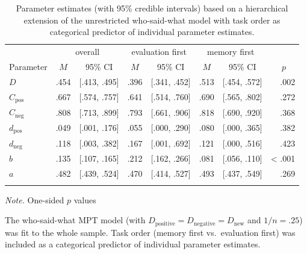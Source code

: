 \documentclass[
  man,floatsintext]{apa6}
\begin{document}
\begin{table}[tbp]

\begin{center}
\begin{threeparttable}

\caption{\label{tab:exp1-param}Parameter estimates (with 95\% credible intervals) based on a hierarchical extension of the unrestricted who-said-what model with task order as categorical predictor of individual parameter estimates.}

\begin{tabular}{lccccccr}
\toprule
 & \multicolumn{2}{c}{overall} & \multicolumn{2}{c}{evaluation first} & \multicolumn{2}{c}{memory first}  &\\
\cmidrule(r){2-3} \cmidrule(r){4-5} \cmidrule(r){6-7}
Parameter & \multicolumn{1}{c}{$M$} & \multicolumn{1}{c}{95\% CI} & \multicolumn{1}{c}{$M$} & \multicolumn{1}{c}{95\% CI} & \multicolumn{1}{c}{$M$} & \multicolumn{1}{c}{95\% CI} & \multicolumn{1}{c}{$\:p$}\\
\midrule
$D$ & .454 & {}[.413, .495] & .396 & {}[.341, .452] & .513 & {}[.454, .572] & .002\\
$C_{\mathrm{pos}}$ & .667 & {}[.574, .757] & .641 & {}[.514, .760] & .690 & {}[.565, .802] & .272\\
$C_{\mathrm{neg}}$ & .808 & {}[.713, .899] & .793 & {}[.661, .906] & .818 & {}[.690, .920] & .368\\
$d_{\mathrm{pos}}$ & .049 & {}[.001, .176] & .055 & {}[.000, .290] & .080 & {}[.000, .365] & .382\\
$d_{\mathrm{neg}}$ & .118 & {}[.003, .382] & .167 & {}[.001, .692] & .121 & {}[.000, .516] & .423\\
$b$ & .135 & {}[.107, .165] & .212 & {}[.162, .266] & .081 & {}[.056, .110] & < .001\\
$a$ & .482 & {}[.439, .524] & .470 & {}[.414, .527] & .493 & {}[.437, .549] & .269\\
\bottomrule
\addlinespace
\end{tabular}

\begin{tablenotes}[para]
\normalsize{\textit{Note.} One-sided $p$ values}
\end{tablenotes}

\end{threeparttable}
\end{center}

\end{table}

The who-said-what MPT model (with \(D_{\mathrm{positive}}=D_{\mathrm{negative}}=D_{\mathrm{new}}\) and \(1/n=.25\)) was fit to the whole sample. Task order (memory first vs.~evaluation first) was included as a categorical predictor of individual parameter estimates.
\end{document}
